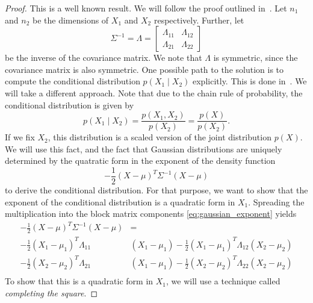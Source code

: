 \begin{proof}
    This is a well known result.
    We will follow the proof outlined in~\cite{bishop2006pattern}.
    Let \( n_{1} \) and \( n_{2} \) be the dimensions of \( X_{1} \) and \( X_{2} \) respectively.
    Further, let \[ \Sigma^{-1} = \Lambda = \begin{bmatrix}
    \Lambda_{11} & \Lambda_{12}\\
    \Lambda_{21} & \Lambda_{22}
    \end{bmatrix} \]
    be the inverse of the covariance matrix. We note that $\Lambda$ is symmetric, since the covariance matrix is also symmetric.
    One possible path to the solution is to compute the conditional distribution \( p(X_{1} \mid X_{2}) \) explicitly.
    This is done in~\cite{soch2024statproofbook}.
    We will take a different approach.
    Note that due to the chain rule of probability, the conditional distribution is given by
    \[
        p(X_{1} \mid X_{2}) = \frac{p(X_{1},X_{2})}{p(X_{2})} = \frac{p(X)}{p(X_{2})}.
    \]
    If we fix $X_{2}$, this distribution is a scaled version of the joint distribution \( p(X) \).
    We will use this fact, and the fact that Gaussian distributions are uniquely determined by the quatratic form in the exponent of the density function
    \begin{equation}
        \label{eq:gaussian_exponent}
        -\frac{1}{2} (X-\mu)^{T} \Sigma^{-1} (X-\mu)
    \end{equation}
    to derive the conditional distribution.
    For that purpose, we want to show that the exponent of the conditional distribution is a quadratic form in $X_{1}$.
    Spreading the multiplication into the block matrix components \eqref{eq:gaussian_exponent} yields
    \begin{equation}\label{eq:conditioned_gaussian_random_vector}
        \begin{aligned}
            -\frac{1}{2}(X-\mu)^{T} \Sigma^{-1} (X-\mu) &= \\
            -\frac{1}{2} ( X_{1} - \mu_{1})^{T}\Lambda_{11}&(X_{1}-\mu_{1}) 
            -\frac{1}{2} ( X_{1} - \mu_{1})^{T}\Lambda_{12}(X_{2}-\mu_{2})\\
            -\frac{1}{2} ( X_{2} - \mu_{2})^{T}\Lambda_{21}&(X_{1}-\mu_{1})
            -\frac{1}{2} ( X_{2} - \mu_{2})^{T}\Lambda_{22}(X_{2}-\mu_{2}) \\
        \end{aligned}    
    \end{equation}
    To show that this is a quadratic form in $X_{1}$, we will use a technique called \textit{completing the square}.

\end{proof}

